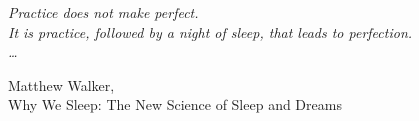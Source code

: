 
\begin{flushright}
  \itshape
  Practice does not make perfect.\\
  It is practice, followed by a night of sleep, that leads to perfection.\\ 
\ldots
\end{flushright}

\begin{flushright}
Matthew Walker,\\
Why We Sleep: The New Science of Sleep and Dreams
\end{flushright}